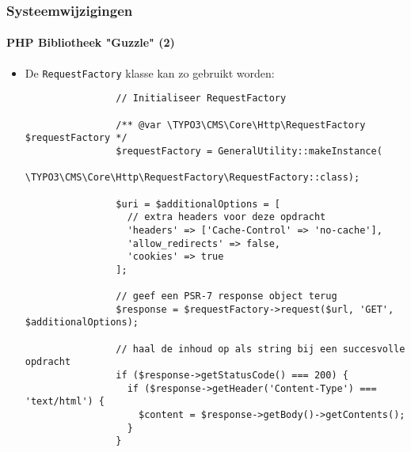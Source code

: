 \begin{frame}[fragile]
	\frametitle{Systeemwijzigingen}
	\framesubtitle{PHP Bibliotheek "Guzzle" (2)}

	\lstset{basicstyle=\tiny\ttfamily}

	\begin{itemize}

		\item De \texttt{RequestFactory} klasse kan zo gebruikt worden:

			\begin{lstlisting}
				// Initialiseer RequestFactory

				/** @var \TYPO3\CMS\Core\Http\RequestFactory $requestFactory */
				$requestFactory = GeneralUtility::makeInstance(
				  \TYPO3\CMS\Core\Http\RequestFactory\RequestFactory::class);

				$uri = $additionalOptions = [
				  // extra headers voor deze opdracht
				  'headers' => ['Cache-Control' => 'no-cache'],
				  'allow_redirects' => false,
				  'cookies' => true
				];

				// geef een PSR-7 response object terug
				$response = $requestFactory->request($url, 'GET', $additionalOptions);

				// haal de inhoud op als string bij een succesvolle opdracht
				if ($response->getStatusCode() === 200) {
				  if ($response->getHeader('Content-Type') === 'text/html') {
				    $content = $response->getBody()->getContents();
				  }
				}
			\end{lstlisting}

	\end{itemize}

\end{frame}


